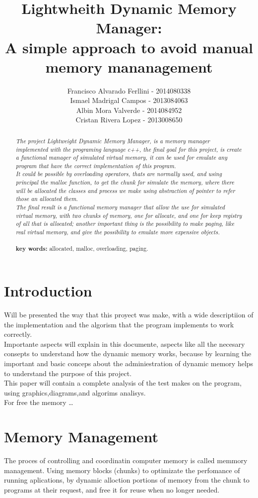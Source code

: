 \documentclass[twocolumn,showkeys,eqsecnum,prd,showpacs,notitlepage,9pt]{article}
\title{\textbf{Lightwheith Dynamic Memory Manager:\\A simple approach to avoid manual\\ memory mananagement}}%
\author{Francisco Alvarado Ferllini - 2014080338\\
		Ismael Madrigal Campos - 2013084063\\
		Albin Mora Valverde - 2014084952\\
		Cristan Rivera Lopez - 2013008650}
\date{}
\begin{document}

\maketitle

\begin{abstract}%
\emph{	The project  Lightweight Dynamic Memory Manager, is a memory manager implemented with the programing  language c++, the final goal for this project, is create a functional manager of simulated virtual memory, it can be used for emulate any program that have the correct implementation of this program.\\
It could be possible by overloading operators, thats are normally used, and using principal the malloc function, to get the chunk for simulate the memory, where there will be allocated the classes and process we make using abstraction of pointer to refer those an allocated them.\\
The final result is a functional memory manager that allow the use for simulated virtual memory, with two chunks of memory, one for allocate, and one for keep registry of all that is allocated; another important thing is the possibility  to make paging, like real virtual memory, and give the possibility to emulate more expensive objects.\\\\}
\textbf{key words: }allocated, malloc, overloading, paging.
\end{abstract}%

\section{Introduction}
	Will be presented the way that this proyect was make, with a wide descriptiion of the implementation and the algorism that the program implements to work correctly.\\
	Importante aspects will explain in this documente, aspects like all the necesary consepts to understand how the dynamic memory works, because by learning the important and basic conceps about the adminiestration of dynamic memory helps to understand the purpose of this project.\\
	This paper will contain a complete analysis of the test makes on the program, using graphics,diagrams,and algorims analisys.\\
	For free the memory \dots
	
\section{Memory Management}
The proces of controlling and coordinatin computer memory is called memmory management. Using memory blocks (chunks) to optimizate the perfomance of running aplications, by dynamic alloction portions of memory from the chunk to programs at their request, and free it for reuse when no longer needed.\\
\end{document}
